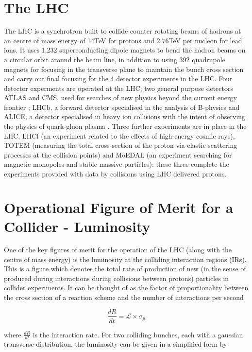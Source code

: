 \section{The LHC}

The LHC is a synchrotron built to collide counter rotating beams of hadrons at an centre of mass energy of 14TeV for protons and 2.76TeV per nucleon for lead ions. It uses 1,232 superconducting dipole magnets to bend the hadron beams on a circular orbit around the beam line, in addition to using 392 quadrupole magnets for focusing in the transverse plane to maintain the bunch cross section and carry out final focusing for the 4 detector experiments in the LHC. Four detector experments are operated at the LHC; two general purpose detectors ATLAS and CMS, used for searches of new physics beyond the current energy frontier \cite{ATLASTDR,CMSDR}; LHCb, a forward detector specialised in the analysis of B-physics \cite{LHCb} and ALICE, a detector specialised in heavy ion collisions with the intent of observing the physics of quark-gluon plasma \cite{Lourenco:ALICE}. Three further experiments are in place in the LHC, LHCf (an experiment related to the effects of high-energy cosmic rays), TOTEM (measuring the total cross-section of the proton via elastic scattering processes at the collision points) and MoEDAL (an experiment searching for magnetic monopoles and stable massive particles): these three complete the experiments provided with data by collisions using LHC delivered protons.

\section{Operational Figure of Merit for a Collider - Luminosity}

One of the key figures of merit for the operation of the LHC (along with the centre of mass energy) is the luminosity at the colliding interaction regions (IRs). This is a figure which denotes the total rate of production of new (in the sense of produced during interactions during collisions between protons) particles in collider experiments. It can be thought of as the factor of proportionality between the cross section of a reaction scheme and the number of interactions per second

\begin{equation} 
\frac{dR}{dt} = \mathcal{L} \times \sigma_{p}
\end{equation}

where $\frac{dR}{dt}$ is the interaction rate. For two colliding bunches, each with a gaussian transverse distribution, the luminosity can be given in a simplified form by

